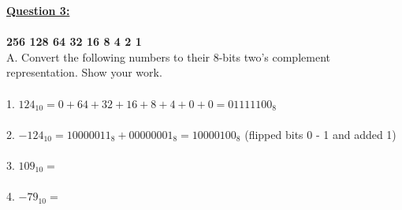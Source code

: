 \documentclass[11pt]{article}
\begin{document}
\noindent \textbf{\ul{Question 3:}} \\
\\
\textbf{256 128 64 32 16 8 4 2 1} \\
A. Convert the following numbers to their 8-bits two's complement representation. Show your work. \\\\
1. $124_{10} = 0 + 64 + 32 + 16 + 8 + 4 + 0 + 0 = 01111100_{8}$\\ \\  
2. $-124_{10} = 10000011_{8} + 00000001_{8} = 10000100_{8}$ (flipped bits 0 - 1 and added 1)\\ \\
3. $109_{10} = $\\ \\
4. $-79_{10} = $\\ \\
\end{document}
